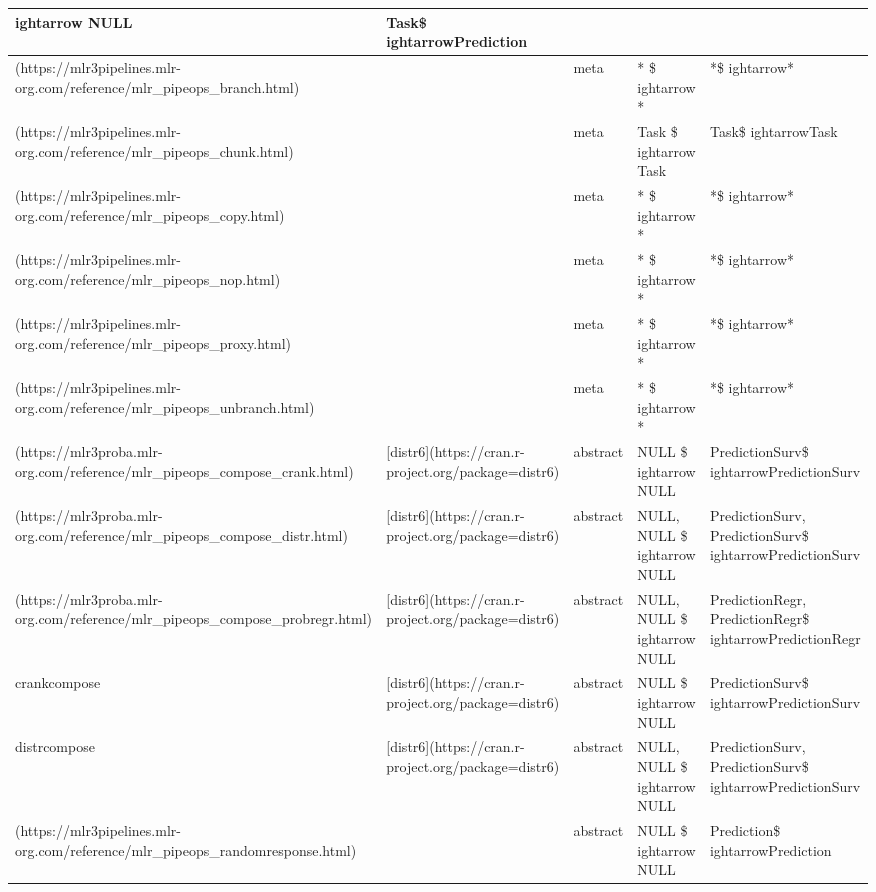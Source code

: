 \documentclass[
]{scrbook}
\begin{document}
\begin{tabular}{l|l|l|l|l}
ightarrow NULL & Task\$
ightarrowPrediction\\
\hline
[`branch`](https://mlr3pipelines.mlr-org.com/reference/mlr\_pipeops\_branch.html) &  & meta & * \$
ightarrow * & *\$
ightarrow*\\
\hline
[`chunk`](https://mlr3pipelines.mlr-org.com/reference/mlr\_pipeops\_chunk.html) &  & meta & Task \$
ightarrow Task & Task\$
ightarrowTask\\
\hline
[`copy`](https://mlr3pipelines.mlr-org.com/reference/mlr\_pipeops\_copy.html) &  & meta & * \$
ightarrow * & *\$
ightarrow*\\
\hline
[`nop`](https://mlr3pipelines.mlr-org.com/reference/mlr\_pipeops\_nop.html) &  & meta & * \$
ightarrow * & *\$
ightarrow*\\
\hline
[`proxy`](https://mlr3pipelines.mlr-org.com/reference/mlr\_pipeops\_proxy.html) &  & meta & * \$
ightarrow * & *\$
ightarrow*\\
\hline
[`unbranch`](https://mlr3pipelines.mlr-org.com/reference/mlr\_pipeops\_unbranch.html) &  & meta & * \$
ightarrow * & *\$
ightarrow*\\
\hline
[`compose\_crank`](https://mlr3proba.mlr-org.com/reference/mlr\_pipeops\_compose\_crank.html) & [distr6](https://cran.r-project.org/package=distr6) & abstract & NULL \$
ightarrow NULL & PredictionSurv\$
ightarrowPredictionSurv\\
\hline
[`compose\_distr`](https://mlr3proba.mlr-org.com/reference/mlr\_pipeops\_compose\_distr.html) & [distr6](https://cran.r-project.org/package=distr6) & abstract & NULL, NULL \$
ightarrow NULL & PredictionSurv, PredictionSurv\$
ightarrowPredictionSurv\\
\hline
[`compose\_probregr`](https://mlr3proba.mlr-org.com/reference/mlr\_pipeops\_compose\_probregr.html) & [distr6](https://cran.r-project.org/package=distr6) & abstract & NULL, NULL \$
ightarrow NULL & PredictionRegr, PredictionRegr\$
ightarrowPredictionRegr\\
\hline
crankcompose & [distr6](https://cran.r-project.org/package=distr6) & abstract & NULL \$
ightarrow NULL & PredictionSurv\$
ightarrowPredictionSurv\\
\hline
distrcompose & [distr6](https://cran.r-project.org/package=distr6) & abstract & NULL, NULL \$
ightarrow NULL & PredictionSurv, PredictionSurv\$
ightarrowPredictionSurv\\
\hline
[`randomresponse`](https://mlr3pipelines.mlr-org.com/reference/mlr\_pipeops\_randomresponse.html) &  & abstract & NULL \$
ightarrow NULL & Prediction\$
ightarrowPrediction\\

\end{tabular}
\end{document}
